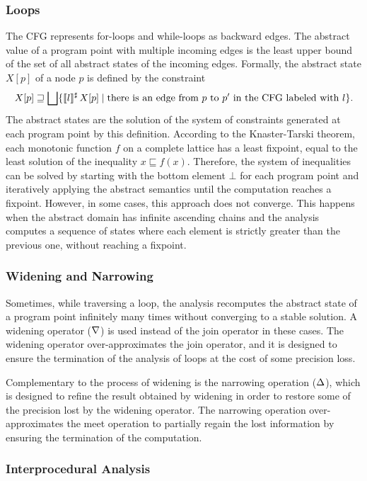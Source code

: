 \subsubsection{Loops}
The CFG represents for-loops and while-loops as backward edges.
The abstract value of a program point with multiple incoming edges is
the least upper bound of the set of all abstract states of the incoming edges.
Formally, the abstract state $X[p]$ of a node $p$ is defined by the constraint
\[
  X[p] \sqsupseteq \bigsqcup \{\llbracket l\rrbracket^\sharp\,X[p] \mid \text{there is an edge from $p$ to $p'$ in the CFG labeled with $l$}\}.
\]
The abstract states are the solution of the system of constraints generated at each program point by this definition.
According to the Knaster-Tarski theorem, each monotonic function $f$ on a complete lattice has a least fixpoint, equal to the least solution of the inequality $x \sqsubseteq f(x)$.
Therefore, the system of inequalities can be solved by starting with the bottom element $\bot$ for each program point and iteratively applying the abstract semantics until the computation reaches a fixpoint.
However, in some cases, this approach does not converge.
This happens when the abstract domain has infinite ascending chains and the analysis computes a sequence of states where each element is strictly greater than the previous one, without reaching a fixpoint.

\subsubsection{Widening and Narrowing}

Sometimes, while traversing a loop, the analysis recomputes the abstract state of a program point infinitely many times without converging to a stable solution.
A widening operator ($\nabla$) is used instead of the join operator in these cases.
The widening operator over-approximates the join operator, and it is designed to ensure the termination of the analysis of loops at the cost of some precision loss.

Complementary to the process of widening is the narrowing operation ($\Delta$), which is designed to refine the result obtained by widening in order to restore some of the precision lost by the widening operator.
The narrowing operation over-approximates the meet operation to partially regain the lost information by ensuring the termination of the computation.

\subsubsection{Interprocedural Analysis}


